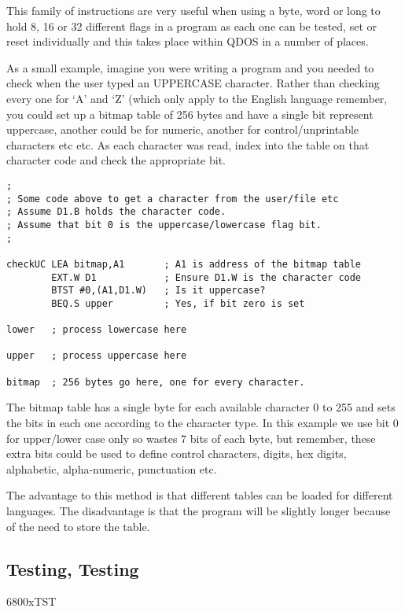This family of instructions are very useful when using a byte,
      word or long to hold 8, 16 or 32 different flags in a program as each
      one can be tested, set or reset individually and this takes place within
      QDOS in a number of places.

As a small example, imagine you were writing a program and you
      needed to check when the user typed an UPPERCASE character. Rather than
      checking every one for `A' and `Z' (which only apply to the English
      language remember, you could set up a bitmap table of 256 bytes and have
      a single bit represent uppercase, another could be for numeric, another
      for control/unprintable characters etc etc. As each character was read,
      index into the table on that character code and check the appropriate
      bit.

\begin{lstlisting}[firstnumber=1,caption={Uppercase Check Example},label={lst:Uppercase Check Example}]
;
; Some code above to get a character from the user/file etc
; Assume D1.B holds the character code.
; Assume that bit 0 is the uppercase/lowercase flag bit.
;

checkUC LEA bitmap,A1       ; A1 is address of the bitmap table
        EXT.W D1            ; Ensure D1.W is the character code
        BTST #0,(A1,D1.W)   ; Is it uppercase?
        BEQ.S upper         ; Yes, if bit zero is set

lower   ; process lowercase here

upper   ; process uppercase here

bitmap  ; 256 bytes go here, one for every character.
\end{lstlisting}

The bitmap table has a single byte for each available character 0
      to 255 and sets the bits in each one according to the character type. In
      this example we use bit 0 for upper/lower case only so wastes 7 bits of
      each byte, but remember, these extra bits could be used to define
      control characters, digits, hex digits, alphabetic, alpha-{}numeric,
      punctuation etc.

The advantage to this method is that different tables can be
      loaded for different languages. The disadvantage is that the program
      will be slightly longer because of the need to store the table.

\subsection{Testing, Testing}\mc6800x{TST}
\label{ch5-testing}%

